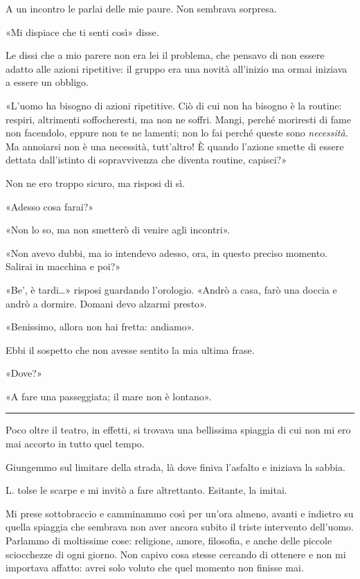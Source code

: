 \documentclass[a4paper,10pt]{memoir}
\begin{document}
A un incontro le parlai delle mie paure. Non sembrava sorpresa.

«Mi dispiace che ti senti così» disse.

Le dissi che a mio parere non era lei il problema, che pensavo di non essere adatto alle azioni ripetitive: il gruppo
era una novità all'inizio ma ormai iniziava a essere un obbligo.

«L'uomo ha bisogno di azioni ripetitive. Ciò di cui non ha bisogno è la routine: respiri, altrimenti soffocheresti, ma
non ne soffri. Mangi, perché moriresti di fame non facendolo, eppure non te ne lamenti; non lo fai perché queste sono
\emph{necessità}. Ma annoiarsi non è una necessità, tutt'altro! È quando l'azione smette di essere dettata dall'istinto
di sopravvivenza che diventa routine, capisci?»

Non ne ero troppo sicuro, ma risposi di sì.

«Adesso cosa farai?»

«Non lo so, ma non smetterò di venire agli incontri».

«Non avevo dubbi, ma io intendevo adesso, ora, in questo preciso momento. Salirai in macchina e poi?»

«Be', è tardi\dots{}»  risposi guardando l'orologio. «Andrò a casa, farò una doccia e andrò a dormire. Domani devo
alzarmi presto».

«Benissimo, allora non hai fretta: andiamo».

Ebbi il sospetto che non avesse sentito la mia ultima frase.

«Dove?»

«A fare una passeggiata; il mare non è lontano».

\plainbreak{1}

Poco oltre il teatro, in effetti, si trovava una bellissima spiaggia di cui non mi ero mai accorto in tutto quel tempo.

Giungemmo sul limitare della strada, là dove finiva l'asfalto e iniziava la sabbia.

L. tolse le scarpe e mi invitò a fare altrettanto. Esitante, la imitai.

Mi prese sottobraccio e camminammo così per un'ora almeno, avanti e indietro su quella spiaggia che sembrava non aver
ancora subito il triste intervento dell'uomo. Parlammo di moltissime cose: religione, amore, filosofia, e anche delle
piccole sciocchezze di ogni giorno. Non capivo cosa stesse cercando di ottenere e non mi importava affatto: avrei solo
voluto che quel momento non finisse mai.
\end{document}
